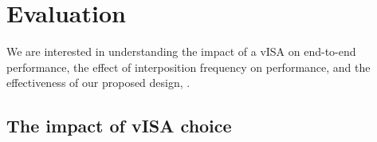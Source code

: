 
\section{Evaluation}
\label{sec:eval}


We are interested in understanding the impact of a vISA on end-to-end performance, the effect of interposition frequency on performance, and the effectiveness of our proposed design, \trillium.

\subsection{The impact of vISA choice}





